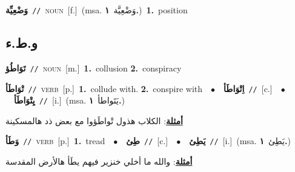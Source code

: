 \documentclass[10pt,a4paper,twoside]{article} %
\begin{document}
\begin{multicols}{2}
{\setlength\topsep{0pt}\textbf{\foreignlanguage{arabic}{وَضْعِيِّة}}\ {\color{gray}\texttt{//}\color{black}}\ \textsc{noun}\ [f.]\ \color{gray}(msa. \foreignlanguage{arabic}{وَضْعِيَّة}~\foreignlanguage{arabic}{\textbf{١.}})\color{black}\ \textbf{1.}~position\ } \vspace{2mm}

\vspace{-3mm}
\subsection*{\color{blue}\foreignlanguage{arabic}{و.ط.ء}\color{blue}{}} 

{\setlength\topsep{0pt}\textbf{\foreignlanguage{arabic}{تَوَاطُؤ}}\ {\color{gray}\texttt{//}\color{black}}\ \textsc{noun}\ [m.]\ \textbf{1.}~collusion  \textbf{2.}~conspiracy\ } \vspace{2mm}

{\setlength\topsep{0pt}\textbf{\foreignlanguage{arabic}{تْوَاطَأ}}\ {\color{gray}\texttt{//}\color{black}}\ \textsc{verb}\ [p.]\ \textbf{1.}~collude with.  \textbf{2.}~conspire with\ \ $\bullet$\ \ \setlength\topsep{0pt}\textbf{\foreignlanguage{arabic}{اِتْوَاطَأ}}\ {\color{gray}\texttt{//}\color{black}}\ [c.]\ \ $\bullet$\ \ \setlength\topsep{0pt}\textbf{\foreignlanguage{arabic}{يِتْوَاطَأ}}\ {\color{gray}\texttt{//}\color{black}}\ [i.]\ \color{gray}(msa. \foreignlanguage{arabic}{يَتَواطأ}~\foreignlanguage{arabic}{\textbf{١.}})\color{black}\  \begin{flushright}\color{gray}\foreignlanguage{arabic}{\textbf{\underline{\foreignlanguage{arabic}{أمثلة}}}: الكلاب هذول تْواطَؤوا مع بعض ذد هالمسكينة}\end{flushright}\color{black}} \vspace{2mm}

{\setlength\topsep{0pt}\textbf{\foreignlanguage{arabic}{وَطَأ}}\ {\color{gray}\texttt{//}\color{black}}\ \textsc{verb}\ [p.]\ \textbf{1.}~tread\ \ $\bullet$\ \ \setlength\topsep{0pt}\textbf{\foreignlanguage{arabic}{طِئ}}\ {\color{gray}\texttt{//}\color{black}}\ [c.]\ \ $\bullet$\ \ \setlength\topsep{0pt}\textbf{\foreignlanguage{arabic}{يَطِئ}}\ {\color{gray}\texttt{//}\color{black}}\ [i.]\ \color{gray}(msa. \foreignlanguage{arabic}{يَطِئ}~\foreignlanguage{arabic}{\textbf{١.}})\color{black}\  \begin{flushright}\color{gray}\foreignlanguage{arabic}{\textbf{\underline{\foreignlanguage{arabic}{أمثلة}}}: والله ما أخلي خنزير فيهم يطَأ هالأرض المقدسة}\end{flushright}\color{black}} \vspace{2mm}


\end{multicols}
\end{document}

